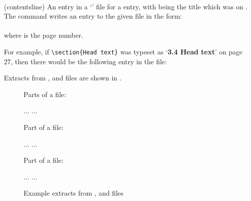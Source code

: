\begin{syntax}
\cmd{\contentsline} \\
\end{syntax}
\glossary(contentsline)%
  {}%
  {An entry in a `\listofx' file for a  entry, with
   being the title which was on .}
     The \cmd{\addcontentsline} command writes an entry to the given file
 in the form: \\
 \cmd{\contentsline} \\
 where  is the page number.

    For example, if \verb?\section{Head text}? was typeset as 
`\textbf{3.4 Head text}' on page 27, then there would be the following
entry in the  file:
\begin{lcode}
\end{lcode}
Extracts from ,  and  files are shown in
.

\begin{figure}
\centering
Parts of a  file:
\begin{lcode}
...
...

\end{lcode}

Part of a  file:

\begin{lcode}
...
\addvspace{10pt}
\addvspace{10pt}
...
\end{lcode}

Part of a  file:

\begin{lcode}
...
\addvspace
{}
...
\end{lcode}
\caption{Example extracts from ,  and  files}
\label{fig:tocloflotfiles}
\end{figure}


